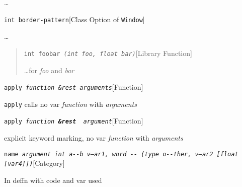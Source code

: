 \documentclass{book}
\begin{document}
%
\dots{}\@

\noindent\texttt{\texttt{int} border-pattern}\hfill[Class Option of \texttt{Window}]



%
\dots{}\@

\begin{quote}
\noindent\texttt{int foobar \bgroup{}\normalfont{}\textsl{(int \textsl{foo}, float \textsl{bar})}\egroup{}}\hfill[Library Function]



%
\dots{}\@ for \textsl{foo} and \textsl{bar}
\end{quote}

\noindent\texttt{apply \bgroup{}\normalfont{}\textsl{function \&rest arguments}\egroup{}}\hfill[Function]



%
\texttt{apply} calls no var \textsl{function} with \textsl{arguments}

\noindent\texttt{apply \bgroup{}\normalfont{}\textsl{function \textnormal{\textbf{\&rest }} argument}\egroup{}}\hfill[Function]



%
explicit keyword marking, no var \textsl{function} with \textsl{arguments}

\noindent\texttt{name \bgroup{}\normalfont{}\textsl{argument \texttt{int} \texttt{a{-}{-}b} \textsl{v--ar1}, word \texttt{{-}{-}} (\texttt{type o{-}{-}ther}, \textsl{v---ar2}  {[}\texttt{float} {[}\textsl{var4}{]}{]})}\egroup{}}\hfill[Category]



%
In deffn with code and var used
\end{document}
